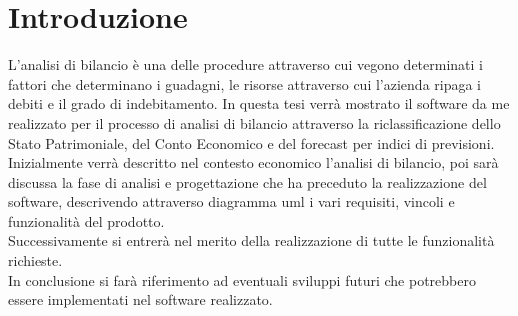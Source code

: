 \chapter*{Introduzione}

L'analisi di bilancio è una delle procedure attraverso cui vegono determinati i fattori che determinano i guadagni, le risorse attraverso cui l'azienda ripaga i debiti e il grado di indebitamento.
In questa tesi verrà mostrato il software da me realizzato per il processo di analisi di bilancio attraverso la riclassificazione dello Stato Patrimoniale, del Conto Economico e del forecast per indici di previsioni.\\
Inizialmente verrà descritto nel contesto economico l'analisi di bilancio, poi sarà discussa la fase di analisi e progettazione che ha preceduto la realizzazione del software, descrivendo attraverso diagramma \Gls{uml} \cite{uml} i vari requisiti, vincoli e funzionalità del prodotto. \\
Successivamente si entrerà nel merito della realizzazione di tutte le funzionalità richieste. \\
In conclusione si farà riferimento ad eventuali sviluppi futuri che potrebbero essere implementati nel software realizzato.
